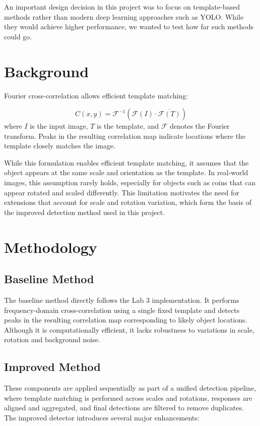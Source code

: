 \documentclass[11pt, letterpaper, twoside]{article}
\begin{document}
An important design decision in this project was to focus on template-based methods rather than modern deep learning approaches such as YOLO. While they would achieve higher performance, we wanted to test how far such methods could go.

\section{Background}

Fourier cross-correlation allows efficient template matching:

\begin{equation}
C(x, y) = \mathcal{F}^{-1}\left(\mathcal{F}(I)\cdot \overline{\mathcal{F}(T)}\right)
\end{equation}
where $I$ is the input image, $T$ is the template, and $\mathcal{F}$ denotes the Fourier transform. Peaks in the resulting correlation map indicate locations where the template closely matches the image.

While this formulation enables efficient template matching, it assumes that the object appears at the same scale and orientation as the template. In real-world images, this assumption rarely holds, especially for objects such as coins that can appear rotated and scaled differently. This limitation motivates the need for extensions that account for scale and rotation variation, which form the basis of the improved detection method used in this project.

\section{Methodology}

\subsection{Baseline Method}

The baseline method directly follows the Lab 3 implementation. It performs frequency-domain cross-correlation using a single fixed template and detects peaks in the resulting correlation map corresponding to likely object locations. Although it is computationally efficient, it lacks robustness to variations in scale, rotation and background noise.

\subsection{Improved Method}
These components are applied sequentially as part of a unified detection pipeline, where template matching is performed across scales and rotations, responses are aligned and aggregated, and final detections are filtered to remove duplicates. The improved detector introduces several major enhancements:
\end{document}
